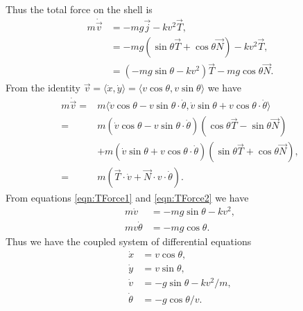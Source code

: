 Thus the total force on the shell is
\begin{align}
m \dot{\vec{v}} &= -mg \vec{j} - kv^2 \vec{T},\nonumber \\
&= -mg( \sin{\theta} \vec{T} + \cos{\theta} \vec{N} ) - kv^2 \vec{T},\nonumber\\
&= (-mg \sin{\theta} - k v^2 ) \vec{T} - mg \cos{\theta} \vec{N}.\label{eqn:TForce1}
\end{align}
From the identity
$\vec{v} = \langle \dot{x}, \dot{y} \rangle = \langle v \cos{\theta}, v \sin{\theta} \rangle$
we have
\begin{align}
m \dot{\vec{v}} = {} & m\langle \dot{v} \cos{\theta} - v\sin{\theta} \cdot \dot{\theta} ,\dot{v}\sin{\theta} + v\cos{\theta} \cdot \dot{\theta} \rangle \nonumber \\
= {} & m(\dot{v}\cos{\theta} - v\sin{\theta} \cdot \dot{\theta})(\cos{\theta} \vec{T} - \sin{\theta}\vec{N}) \nonumber \\
& + m(\dot{v} \sin{\theta} + v\cos{\theta} \cdot \dot{\theta})( \sin{\theta} \vec{T} + \cos{\theta} \vec{N}) ,  \nonumber \\
= {} & m(\vec{T} \cdot \dot{v} + \vec{N} \cdot v \cdot \dot{\theta}) .\label{eqn:TForce2}
%
\end{align}
From equations \eqref{eqn:TForce1} and \eqref{eqn:TForce2} we have
\begin{align*}
m \dot{v} &= -mg\sin{\theta} - k v^2,\\
mv\dot{\theta} &= -mg \cos{\theta}.
\end{align*}
Thus we have the coupled system of differential equations
\begin{align}
\dot{x} &= v\cos{\theta}, \nonumber \\
\dot{y} &= v\sin{\theta},\nonumber \\
\dot{v} &= -g\sin{\theta} -  k v^2/m,\nonumber \\
\dot{\theta} &= -g \cos{\theta}/v. \nonumber
\end{align}

